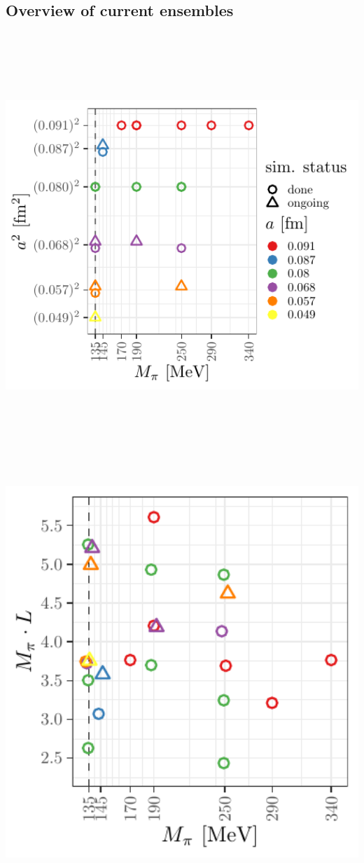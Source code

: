 \documentclass[a0,portrait]{a0poster}
\begin{document}
\begin{multicols}{2}
    \section{Overview of current ensembles}
    \includegraphics[height=16cm]{ensembles_asquared_mpi}
    \includegraphics[height=16cm]{ensembles_L_vs_mpi}


\end{multicols}
\end{document}

